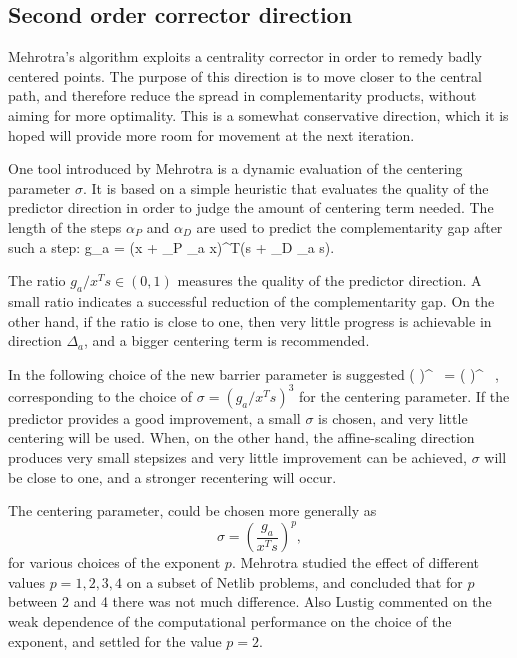 %
%
\subsection{Second order corrector direction}

Mehrotra's algorithm exploits a centrality corrector in order to 
remedy badly centered points. The purpose of this direction is 
to move closer to the central path, and therefore reduce the spread 
in complementarity products, without aiming for more optimality. 
This is a somewhat conservative direction, which it is hoped will 
provide more room for movement at the next iteration.

One tool introduced by Mehrotra \cite{Mehrotra92} is a dynamic evaluation 
of the centering parameter $\sigma$. It is based on a simple  
heuristic that evaluates the quality of the predictor direction
in order to judge the amount of centering term needed.
%
The length of the steps $\alpha_P$ and $\alpha_D$ are used to 
predict the complementarity gap after such a step:
\be \label{eq:PredictedGap}
  g_a = (x + \alpha_P \Delta_a x)^T(s + \alpha_D \Delta_a s).
\ee

The ratio $g_a / x^{T}s \in (0,1)$ measures the quality of the 
predictor direction.
A small ratio indicates a successful reduction of the complementarity 
gap. On the other hand, if the ratio is close to one, then very little 
progress is achievable in direction $\Delta_a$, and a bigger centering term
is recommended.

In \cite{Mehrotra92} the following choice of the new barrier parameter 
is suggested
%
\be \label{eq:Mu}
  \left(  \right)^{} \, 
           = \left(  \right)^{} \, ,
\ee
%
corresponding to the choice of $\sigma = (g_a / x^Ts)^3$ 
for the centering parameter. 
If the predictor provides a good improvement, a small $\sigma$ 
is chosen, and very little centering will be used. When, 
on the other hand, the affine-scaling direction produces very small stepsizes 
and very little improvement can be achieved, $\sigma$ will be 
close to one, and a stronger recentering will occur.

The centering parameter, could be chosen more generally as
\[
  \sigma = \left( \frac{g_a}{x^Ts} \right)^p\!\!,
\]
for various choices of the exponent $p$. Mehrotra \cite{Mehrotra92}
studied the effect of different values $p=1,2,3,4$
on a subset of Netlib problems, and concluded that for $p$ between
2 and 4 there was not much difference.
Also Lustig \etal \cite{LustigMarstenShanno} commented on the
weak dependence of the computational performance on the choice 
of the exponent, and settled for the value $p=2$.

